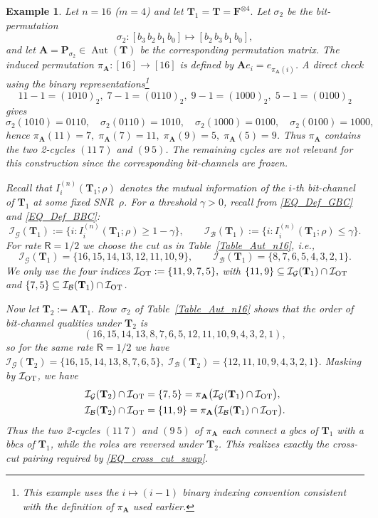\documentclass[onecolumn]{IEEEtran} %
\newcommand{\bA}{\mathbf A}
\newcommand{\bP}{\mathbf P}
\newcommand{\1}{\mathbbm{1}}
\DeclareMathOperator{\Aut}{Aut}
\theoremstyle{boldremark}
\newtheorem{example}{Example}
\newcommand{\bT}{\mathbf{T}}
\begin{document}
\begin{example}\label{ex:n16-119-75}
Let $n=16$ ($m=4$) and let $  \bT_1 = \bT = \mathbf F^{\otimes 4}.$ Let $\sigma_2$ be the bit-permutation
\[
  \sigma_2 : [b_3\,b_2\,b_1\,b_0] \mapsto [b_2\,b_3\,b_1\,b_0],
\]
and let $\bA = \bP_{\sigma_2}\in\Aut(\bT)$ be the corresponding
permutation matrix.  The induced permutation
$\pi_{\bA}:[16]\to[16]$ is defined by
$\bA e_i = e_{\pi_{\bA}(i)}$.  A direct check using the binary
representations\footnote{This example uses the $i\mapsto (i-1)$ binary indexing convention consistent with the definition of $\pi_{\bA}$ used earlier.}
\[
  11-1=(1010)_2,\;7-1=(0110)_2,\;9-1=(1000)_2,\;5-1=(0100)_2
\]
gives
\[
  \sigma_2(1010)=0110,\quad
  \sigma_2(0110)=1010,\quad
  \sigma_2(1000)=0100,\quad
  \sigma_2(0100)=1000,
\]
hence $  \pi_{\bA}(11)=7,\;  \pi_{\bA}(7)=11,\;  \pi_{\bA}(9)=5,\;  \pi_{\bA}(5)=9$.  Thus $\pi_{\bA}$ contains the two 2-cycles $(11\ 7)$ and $(9\ 5)$.
The remaining cycles are not
relevant for this construction since the corresponding bit-channels are frozen.

Recall that $I^{(n)}_i(\bT_1;\rho)$ denotes the mutual information of the $i$-th
bit-channel of $\bT_1$ at some fixed SNR~$\rho$.  For a threshold
$\gamma>0$, recall from \eqref{EQ_Def_GBC} and \eqref{EQ_Def_BBC}:
\[
  \mathcal{I}_{\mathcal G}(\bT_1)
  :=\bigl\{ i : I^{(n)}_i(\bT_1;\rho)\ge 1-\gamma\bigr\},
  \qquad
  \mathcal{I}_{\mathcal B}(\bT_1)
  :=\bigl\{ i : I^{(n)}_i(\bT_1;\rho)\le \gamma\bigr\}.
\]
For rate $\textsf{R}=1/2$ we choose the cut as in Table~\ref{Table_Aut_n16}, i.e.,
\[
  \mathcal{I}_{\mathcal G}(\bT_1) = \{16,15,14,13,12,11,10,9\},\qquad
  \mathcal{I}_{\mathcal B}(\bT_1) = \{8,7,6,5,4,3,2,1\}.
\]
We only use the four indices $\mathcal I_{\rm OT} := \{11,9,7,5\},$
with $\{11,9\}\subseteq\mathcal{I}_{\mathcal G}(\bT_1)\cap\mathcal I_{\rm OT}$ and
$\{7,5\}\subseteq\mathcal{I}_{\mathcal B}(\bT_1)\cap\mathcal I_{\rm OT}$.

Now let $  \bT_2 := \bA\bT_1.$ Row~$\sigma_2$ of Table~\ref{Table_Aut_n16} shows that the order of bit-channel
qualities under $\bT_2$ is
\[
  (16,15,14,13,8,7,6,5,12,11,10,9,4,3,2,1),
\]
so for the same rate $\textsf{R}=1/2$ we have $ \mathcal{I}_{\mathcal G}(\bT_2)
   = \{16,15,14,13,8,7,6,5\},\;  \mathcal{I}_{\mathcal B}(\bT_2)   = \{12,11,10,9,4,3,2,1\}.$ Masking by $\mathcal I_{\rm OT}$, we have
\begin{align}
  \mathcal{I}_{\mathcal G}(\bT_2)\cap\mathcal I_{\rm OT}
    &= \{7,5\}
     = \pi_{\bA}\bigl(\mathcal{I}_{\mathcal G}(\bT_1)\cap\mathcal I_{\rm OT}\bigr),\notag\\
  \mathcal{I}_{\mathcal B}(\bT_2)\cap\mathcal I_{\rm OT}
    &= \{11,9\}
     = \pi_{\bA}\bigl(\mathcal{I}_{\mathcal B}(\bT_1)\cap\mathcal I_{\rm OT}\bigr).
\end{align}
Thus the two 2-cycles $(11\ 7)$ and $(9\ 5)$ of $\pi_{\bA}$ each connect
a \gls{gbcs} of $\bT_1$ with a \gls{bbcs} of $\bT_1$, while
the roles are reversed under $\bT_2$. This realizes exactly the
cross-cut pairing required by \eqref{EQ_cross_cut_swap}.


\end{example}
\end{document}
